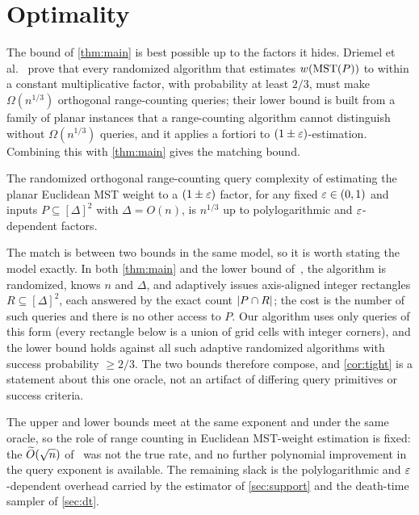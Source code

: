 \section{Optimality}\label{sec:optimality}

The bound of \cref{thm:main} is best possible up to the factors it hides. Driemel et
al.~\cite{DMOSW25} prove that every randomized algorithm that estimates $w(\mathrm{MST}(P))$ to within a
constant multiplicative factor, with probability at least $2/3$, must make $\Omega(n^{1/3})$
orthogonal range-counting queries; their lower bound is built from a family of planar instances that a
range-counting algorithm cannot distinguish without $\Omega(n^{1/3})$ queries, and it applies a fortiori
to $(1\pm\varepsilon)$-estimation. Combining this with \cref{thm:main} gives the matching bound.

\begin{corollary}\label{cor:tight}
The randomized orthogonal range-counting query complexity of estimating the planar Euclidean MST weight to
a $(1\pm\varepsilon)$ factor, for any fixed $\varepsilon\in(0,1)$ and inputs $P\subseteq[\Delta]^2$ with $\Delta=O(n)$, is
$n^{1/3}$ up to polylogarithmic and $\varepsilon$-dependent factors.
\end{corollary}

\begin{remark}\label{rem:model}
The match is between two bounds in the same model, so it is worth stating the model exactly. In both
\cref{thm:main} and the lower bound of~\cite{DMOSW25}, the algorithm is randomized, knows $n$ and
$\Delta$, and adaptively issues axis-aligned integer rectangles $R\subseteq[\Delta]^2$, each answered by
the exact count $\left|P\cap R\right|$; the cost is the number of such queries and there is no other access to
$P$. Our algorithm uses only queries of this form (every rectangle below is a union of grid cells with
integer corners), and the lower bound holds against all such adaptive randomized algorithms with success
probability $\ge 2/3$. The two bounds therefore compose, and \cref{cor:tight} is a statement about this one
oracle, not an artifact of differing query primitives or success criteria.
\end{remark}

The upper and lower bounds meet at the same exponent and under the same oracle, so the role of range
counting in Euclidean MST-weight estimation is fixed: the $\widetilde{O}(\sqrt n)$ of~\cite{DMOSW25} was not the
true rate, and no further polynomial improvement in the query exponent is available. The remaining slack
is the polylogarithmic and $\varepsilon$-dependent overhead carried by the estimator of \cref{sec:support} and
the death-time sampler of \cref{sec:dt}.

